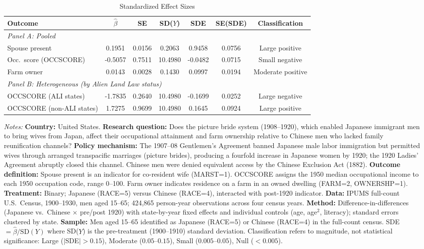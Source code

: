 \begin{table}[t]
\centering
\caption{Standardized Effect Sizes}
\label{tab:sde}
\begin{threeparttable}
\footnotesize
\begin{tabular}{lcccccc}
\toprule
Outcome & $\hat{\beta}$ & SE & SD($Y$) & SDE & SE(SDE) & Classification \\
\midrule
\multicolumn{7}{l}{\textit{Panel A: Pooled}} \\
Spouse present & 0.1951 & 0.0156 & 0.2063 & 0.9458 & 0.0756 & Large positive \\
Occ.\ score (OCCSCORE) & -0.5057 & 0.7511 & 10.4980 & -0.0482 & 0.0715 & Small negative \\
Farm owner & 0.0143 & 0.0028 & 0.1430 & 0.0997 & 0.0194 & Moderate positive \\
\midrule
\multicolumn{7}{l}{\textit{Panel B: Heterogeneous (by Alien Land Law status)}} \\
OCCSCORE (ALI states) & -1.7835 & 0.2640 & 10.4980 & -0.1699 & 0.0252 & Large negative \\
OCCSCORE (non-ALI states) & 1.7275 & 0.9699 & 10.4980 & 0.1645 & 0.0924 & Large positive \\
\bottomrule
\end{tabular}
\end{threeparttable}
\vspace{0.5em}
\parbox{\textwidth}{\scriptsize \textit{Notes:} \textbf{Country:} United States. \textbf{Research question:} Does the picture bride system (1908--1920), which enabled Japanese immigrant men to bring wives from Japan, affect their occupational attainment and farm ownership relative to Chinese men who lacked family reunification channels? \textbf{Policy mechanism:} The 1907--08 Gentlemen's Agreement banned Japanese male labor immigration but permitted wives through arranged transpacific marriages (picture brides), producing a fourfold increase in Japanese women by 1920; the 1920 Ladies' Agreement abruptly closed this channel. Chinese men were denied equivalent access by the Chinese Exclusion Act (1882). \textbf{Outcome definition:} Spouse present is an indicator for co-resident wife (MARST=1). OCCSCORE assigns the 1950 median occupational income to each 1950 occupation code, range 0--100. Farm owner indicates residence on a farm in an owned dwelling (FARM=2, OWNERSHP=1). \textbf{Treatment:} Binary; Japanese (RACE=5) versus Chinese (RACE=4), interacted with post-1920 indicator. \textbf{Data:} IPUMS full-count U.S.\ Census, 1900--1930, men aged 15--65; 424,865 person-year observations across four census years. \textbf{Method:} Difference-in-differences (Japanese vs.\ Chinese $\times$ pre/post 1920) with state-by-year fixed effects and individual controls (age, age$^2$, literacy); standard errors clustered by state. \textbf{Sample:} Men aged 15--65 identified as Japanese (RACE=5) or Chinese (RACE=4) in the full-count census. SDE $= \hat{\beta} / \text{SD}(Y)$ where SD($Y$) is the pre-treatment (1900--1910) standard deviation. Classification refers to magnitude, not statistical significance: Large ($|$SDE$| > 0.15$), Moderate ($0.05$--$0.15$), Small ($0.005$--$0.05$), Null ($< 0.005$).
}
\end{table}
